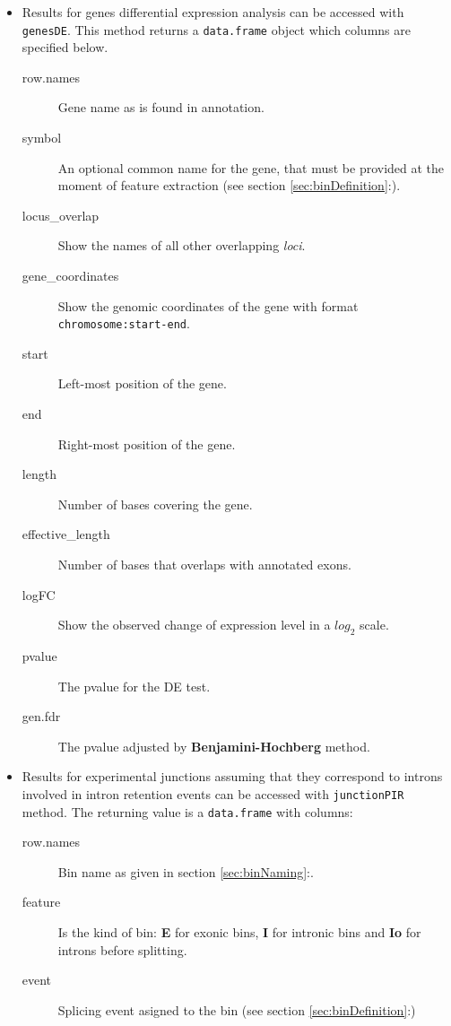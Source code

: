 \documentclass{article}
\newcommand{\secref}[1]{\ref{#1}:\nameref{#1}}
\begin{document}
\begin{itemize}
  \item Results for genes differential expression analysis can be accessed with
  \texttt{genesDE}. This method returns a \texttt{data.frame}
  object which columns are specified below.
    \begin{description}
      \item[row.names] Gene name as is found in annotation.
      \item[symbol] An optional common name for the gene, that must be provided at
      the moment of feature extraction (see section
      \secref{sec:binDefinition}).
      \item[locus\_overlap] Show the names of all other overlapping
      \textit{loci}.
      \item[gene\_coordinates] Show the genomic coordinates of the gene with
      format \texttt{chromosome:start-end}.
      \item[start] Left-most position of the gene.
      \item[end] Right-most position of the gene.
      \item[length] Number of bases covering the gene.
      \item[effective\_length] Number of bases that overlaps with annotated exons.
      \item[logFC] Show the observed change of expression level in a $log_{2}$
      scale.
      \item[pvalue] The pvalue for the DE test.
      \item[gen.fdr] The pvalue adjusted by \textbf{Benjamini-Hochberg} method.
      \\
    \end{description}
  \item Results for experimental junctions assuming that they correspond to
  introns involved in intron retention events can be accessed with
  \texttt{junctionPIR} method. The returning value is a \texttt{data.frame} with
  columns:
    \begin{description}
      \item[row.names] Bin name as given in section \ref{sec:binNaming}:.
      \item[feature] Is the kind of bin: \textbf{E} for exonic bins, \textbf{I}
      for intronic bins and \textbf{Io} for introns before splitting.
      \item[event] Splicing event asigned to the bin (see section
      \ref{sec:binDefinition}:)

\end{description}
\end{itemize}
\end{document}

